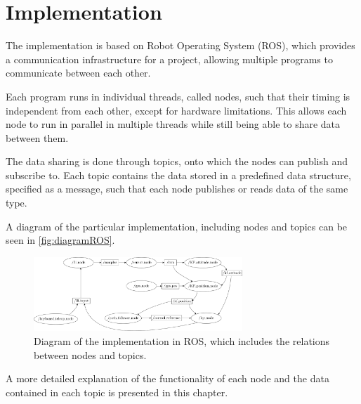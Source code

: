\chapter{Implementation}
The implementation is based on Robot Operating System (ROS), which provides a communication infrastructure for a project, allowing multiple programs to communicate between each other. 

Each program runs in individual threads, called nodes, such that their timing is independent from each other, except for hardware limitations. This allows each node to run in parallel in multiple threads while still being able to share data between them.

The data sharing is done through topics, onto which the nodes can publish and subscribe to. Each topic contains the data stored in a predefined data structure, specified as a message, such that each node publishes or reads data of the same type.

A diagram of the particular implementation, including nodes and topics can be seen in \autoref{fig:diagramROS}.

\begin{figure}[H]
    \includegraphics[width=0.7\textwidth]{figures/diagramROS}
    \caption{Diagram of the implementation in ROS, which includes the relations between nodes and topics.}
    \label{fig:diagramROS}
\end{figure}

A more detailed explanation of the functionality of each node and the data contained in each topic is presented in this chapter.


